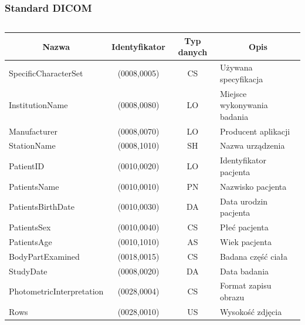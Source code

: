 \documentclass[aspectratio=169]{beamer}
\newcommand*{\thead}[1]{\multicolumn{1}{|c|}{\bfseries #1}}
\begin{document}
\begin{frame}
    \frametitle{Standard DICOM}
    \tiny

    \begin{columns}

        \begin{tabular}{|l|c|c|l|}
            \hline
            \thead{Nazwa}             & \thead{Identyfikator} & \thead{Typ danych} & \thead{Opis}                \\\hline
            SpecificCharacterSet      & (0008,0005)           & CS                 & Używana specyfikacja        \\\hline
            InstitutionName           & (0008,0080)           & LO                 & Miejsce wykonywania badania \\\hline
            Manufacturer              & (0008,0070)           & LO                 & Producent aplikacji         \\\hline
            StationName               & (0008,1010)           & SH                 & Nazwa urządzenia            \\\hline
            PatientID                 & (0010,0020)           & LO                 & Identyfikator pacjenta      \\\hline
            PatientsName              & (0010,0010)           & PN                 & Nazwisko pacjenta           \\\hline
            PatientsBirthDate         & (0010,0030)           & DA                 & Data urodzin pacjenta       \\\hline
            PatientsSex               & (0010,0040)           & CS                 & Płeć pacjenta               \\\hline
            PatientsAge               & (0010,1010)           & AS                 & Wiek pacjenta               \\\hline
            BodyPartExamined          & (0018,0015)           & CS                 & Badana część ciała          \\\hline
            StudyDate                 & (0008,0020)           & DA                 & Data badania                \\\hline
            PhotometricInterpretation & (0028,0004)           & CS                 & Format zapisu obrazu        \\\hline
            Rows                      & (0028,0010)           & US                 & Wysokość zdjęcia            \\\hline

\end{tabular}
\end{columns}
\end{frame}
\end{document}
